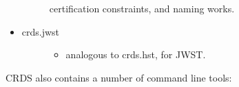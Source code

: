 \documentclass[letterpaper,10pt,english]{sphinxmanual}
\begin{document}
\begin{itemize}
\begin{description}
certification constraints, and naming works.

\end{description}

\item {} \begin{description}
\item[{crds.jwst}] \leavevmode\begin{itemize}
\item {} 
analogous to crds.hst,  for JWST.

\end{itemize}

\end{description}

\end{itemize}

CRDS also contains a number of command line tools:
\end{document}
